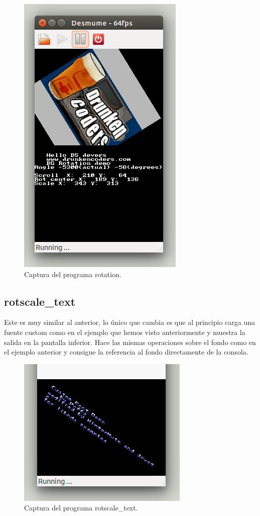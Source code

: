 \documentclass[12pt,english]{article}
\begin{document}
    \begin{figure}[H] 
    \centering
    \includegraphics[scale=0.5]{images/rotation}
    \caption{Captura del programa rotation.}
    \end{figure}

    \newpage

    \subsection{rotscale\_text}

    Este es muy similar al anterior, lo único que cambia es que al principio carga una fuente custom como en el ejemplo que hemos visto anteriormente y muestra la salida en la pantalla inferior. Hace las mismas operaciones sobre el fondo como en el ejemplo anterior y consigue la referencia al fondo directamente de la consola. 

    \begin{figure}[H] 
    \centering
    \includegraphics[scale=0.5]{images/rotscale_text}
    \caption{Captura del programa rotscale\_text.}
    \end{figure}
\end{document}
